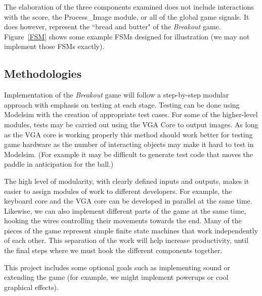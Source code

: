 \documentclass[conference]{IEEEtran}
\begin{document}
The elaboration of the three components examined does not include interactions with the score, the Process\_Image module, or all of the global game signals. It does however, represent the ``bread and butter" of the \emph{Breakout} game. Figure~\ref{FSM} shows some example FSMs designed for illustration (we may not implement those FSMs exactly).

\subsection{Methodologies}
Implementation of the \emph{Breakout} game will follow a step-by-step modular approach with emphasis on testing at each stage. Testing can be done using Modelsim with the creation of appropriate test cases. For some of the higher-level modules, tests may be carried out using the VGA Core to output images. As long as the VGA core is working properly this method should work better for testing game hardware as the number of interacting objects may make it hard to test in Modelsim. (For example it may be difficult to generate test code that moves the paddle in anticipation for the ball.) 

The high level of modularity, with clearly defined inputs and outputs, makes it easier to assign modules of work to different developers. For example, the keyboard core and the VGA core can be developed in parallel at the same time. Likewise, we can also implement different parts of the game at the same time, hooking the wires controlling their movements towards the end. Many of the pieces of the game represent simple finite state machines that work independently of each other. This separation of the work will help increase productivity, until the final steps where we must hook the different components together.

This project includes some optional goals such as implementing sound or extending the game (for example, we might implement powerups or cool graphical effects). 
\end{document}
